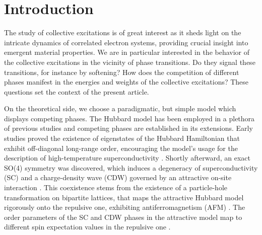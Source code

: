 \documentclass[
    reprint, 
    aps,
    preprintnumbers,
    twocolumn,
    prb,
    superscriptaddress
]{revtex4-2}
\begin{document}
\maketitle


\section{Introduction}\label{sec:introduction}


The study of collective excitations is of great interest as it sheds light on the intricate dynamics of correlated electron systems, providing crucial insight into emergent material properties.
We are in particular interested in the behavior of the collective excitations in the vicinity of phase transitions.
Do they signal these transitions, for instance by softening? 
How does the competition of different phases manifest in the energies and weights of the collective excitations?
These questions set the context of the present article. 

On the theoretical side, we choose a paradigmatic, but simple model which displays competing phases.
The Hubbard model has been employed in a plethora of previous studies and competing phases are established in its extensions. 
Early studies proved the existence of eigenstates of the Hubbard Hamiltonian that exhibit off-diagonal long-range order, encouraging the model's usage for the description of high-temperature superconductivity \cite{yang89}.
Shortly afterward, an exact SO(4) symmetry was discovered, which induces a degeneracy of 
superconductivity (SC) and a charge-density wave (CDW) governed by an attractive on-site interaction \cite{yang90}.
This coexistence stems from the existence of a particle-hole transformation on bipartite lattices, 
that maps the attractive Hubbard model rigorously onto the repulsive one, 
exhibiting antiferromagnetism (AFM) \cite{Hirsch85}.
The order parameters of the SC and CDW phases in the attractive model map to different spin expectation values in the repulsive one \cite{zitko15,lieb89}.
\end{document}
